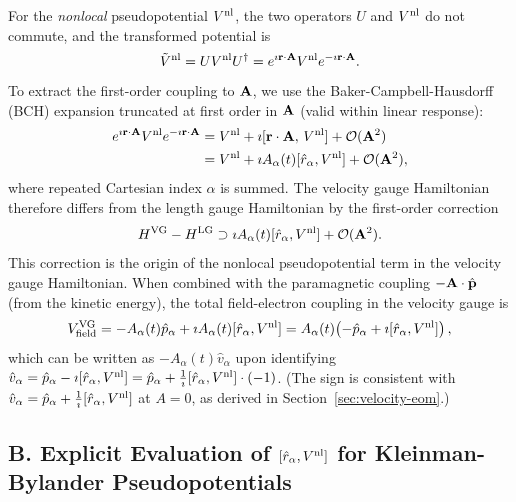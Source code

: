 For the \emph{nonlocal} pseudopotential $V^{\mathrm{nl}}$, the two operators
$U$ and $V^{\mathrm{nl}}$ do not commute, and the transformed potential is
\begin{equation}
  \tilde{V}^{\mathrm{nl}}
  = UV^{\mathrm{nl}} U^\dag
  = e^{\imath\mathbf{r}\cdot\mathbf{A}}V^{\mathrm{nl}}
    e^{-\imath\mathbf{r}\cdot\mathbf{A}}.
  \label{eq:Vnl-transformed}
\end{equation}
To extract the first-order coupling to $\mathbf{A}$, we use the
Baker-Campbell-Hausdorff (BCH) expansion truncated at first order
in $\mathbf{A}$ (valid within linear response):
\begin{align}
  e^{\imath\mathbf{r}\cdot\mathbf{A}}V^{\mathrm{nl}} e^{-\imath\mathbf{r}\cdot\mathbf{A}}
  &= V^{\mathrm{nl}}
   + \imath[\mathbf{r}\cdot\mathbf{A},\, V^{\mathrm{nl}}]
   + \mathcal{O}(\mathbf{A}^2)
  \nonumber \\
  &= V^{\mathrm{nl}}
   + \imath A_\alpha(t)[\hat{r}_\alpha,V^{\mathrm{nl}}]
   + \mathcal{O}(\mathbf{A}^2),
  \label{eq:Vnl-BCH}
\end{align}
where repeated Cartesian index $\alpha$ is summed.
The velocity gauge Hamiltonian therefore differs from the length
gauge Hamiltonian by the first-order correction
\begin{equation}
  H^{\mathrm{VG}} - H^{\mathrm{LG}}
  \supset \imath A_\alpha(t)[\hat{r}_\alpha,V^{\mathrm{nl}}]
  + \mathcal{O}(\mathbf{A}^2).
  \label{eq:H-VG-correction}
\end{equation}
This correction is the origin of the nonlocal pseudopotential term
in the velocity gauge Hamiltonian.
When combined with the paramagnetic coupling
$-\mathbf{A}\cdot\hat{\mathbf{p}}$ (from the kinetic energy), the
total field-electron coupling in the velocity gauge is
\begin{equation}
  V_{\mathrm{field}}^{\mathrm{VG}}
  = -A_\alpha(t)\hat{p}_\alpha
    + \imath A_\alpha(t)[\hat{r}_\alpha,V^{\mathrm{nl}}]
  = A_\alpha(t)\!\left(-\hat{p}_\alpha
    + \imath[\hat{r}_\alpha,V^{\mathrm{nl}}]\right),
  \label{eq:V-field-VG}
\end{equation}
which can be written as $-A_\alpha(t)\hat{v}_\alpha$ upon
identifying $\hat{v}_\alpha = \hat{p}_\alpha -
\imath[\hat{r}_\alpha,V^{\mathrm{nl}}] = \hat{p}_\alpha +
\frac{1}{\imath}[\hat{r}_\alpha,V^{\mathrm{nl}}]\cdot(-1)$.
(The sign is consistent with $\hat{v}_\alpha = \hat{p}_\alpha +
\frac{1}{\imath}[\hat{r}_\alpha,V^{\mathrm{nl}}]$ at $A=0$, as derived in
Section~\ref{sec:velocity-eom}.)

\subsection*{B.\; Explicit Evaluation of $[\hat{r}_\alpha, V^{\mathrm{nl}}]$
  for Kleinman-Bylander Pseudopotentials}
\label{app:KB-commutator}

